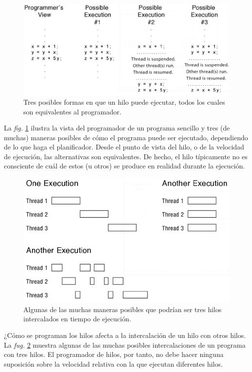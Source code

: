 \documentclass[10pt]{book}
\begin{document}
\begin{figure}[tbhp]
\centerline{\includegraphics[scale=0.45]{img/fig0401}}
\caption{Tres posibles formas en que un hilo puede ejecutar, todos los cuales son equivalentes al programador.}
\label{fig0401}
\end{figure}

La \textit{fig.} \ref{fig0401} ilustra la vista del programador de un programa sencillo y tres (de muchas) maneras posibles de cómo el programa puede ser ejecutado, dependiendo de lo que haga el planificador. Desde el punto de vista del hilo, o de la velocidad de ejecución, las alternativas son equivalentes. De hecho, el hilo típicamente no es consciente de cuál de estos (u otros) se produce en realidad durante la ejecución.

\begin{figure}[tbhp]
\centerline{\includegraphics[scale=0.45]{img/fig0402}}
\caption{Algunas de las muchas maneras posibles que podrían ser tres hilos intercalados en tiempo de ejecución.}
\label{fig0402}
\end{figure}

¿Cómo se programan los hilos afecta a la intercalación de un hilo con otros hilos. La \textit{fug.} \ref{fig0402} muestra algunas de las muchas posibles intercalaciones de un programa con tres hilos. El programador de hilos, por tanto, no debe hacer ninguna suposición sobre la velocidad relativa con la que ejecutan diferentes hilos.
\end{document}
